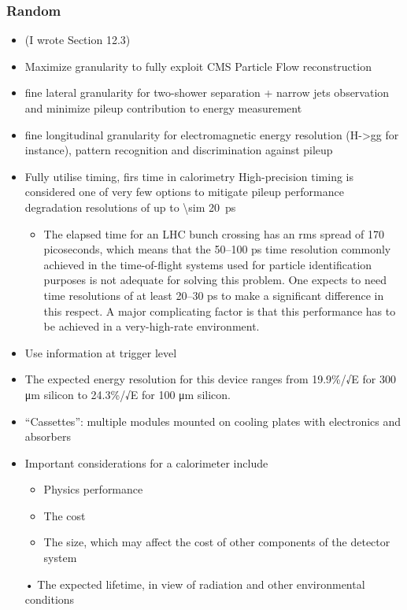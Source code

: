 \documentclass[11pt]{article}
\begin{document}
\subsubsection{Random}
\label{sec:orgb36b9c8}
\begin{itemize}
\item \cite{hlttdr} (I wrote Section 12.3)
\item Maximize granularity to fully exploit CMS Particle Flow reconstruction
\item fine lateral granularity for two-shower separation + narrow jets observation and minimize pileup contribution to energy measurement
\item fine longitudinal granularity for electromagnetic energy resolution (H->gg for instance), pattern recognition and discrimination against pileup
\item Fully utilise timing, firs time in calorimetry High-precision timing is considered one of very few options to mitigate pileup performance degradation \cite{wigmans2} resolutions of up to \SI{\sim 20}{\pico\second} \cite{calorimetry_fabjan}
\begin{itemize}
\item The elapsed time for an LHC bunch crossing has an rms spread of 170 picoseconds, which means that the 50–100 ps time resolution commonly achieved in the time-of-flight systems used for particle identification purposes is not adequate for solving this problem. One expects to need time resolutions of at least 20–30 ps to make a significant difference in this respect. A major complicating factor is that this performance has to be achieved in a very-high-rate environment.
\end{itemize}
\item Use information at trigger level
\item The expected energy resolution for this device ranges from 19.9\%/√E for 300 μm silicon to 24.3\%/√E for 100 μm silicon. \cite{wigmans2}
\item ``Cassettes'': multiple modules mounted on cooling plates with electronics and absorbers
\item Important considerations for a calorimeter include
\begin{itemize}
\item Physics performance
\item The cost
\item The size, which may affect the cost of other components of the detector system
\end{itemize}
• The expected lifetime, in view of radiation and other environmental conditions
\end{itemize}
\end{document}
